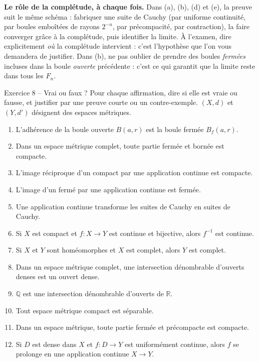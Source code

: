 \documentclass[11pt,a4paper]{article}
\newcommand{\R}{\mathbb{R}}
\newcommand{\Q}{\mathbb{Q}}
\newcommand{\Bf}{B_f}
\theoremstyle{definition}
\begin{document}
\begin{methode}
\textbf{Le rôle de la complétude, à chaque fois.} Dans (a), (b), (d) et (e), la preuve suit le même schéma : fabriquer une suite de Cauchy (par uniforme continuité, par boules emboîtées de rayons $2^{-n}$, par précompacité, par contraction), la faire converger grâce à la complétude, puis identifier la limite. À l'examen, dire explicitement \emph{où} la complétude intervient : c'est l'hypothèse que l'on vous demandera de justifier. Dans (b), ne pas oublier de prendre des boules \emph{fermées} incluses dans la boule \emph{ouverte} précédente : c'est ce qui garantit que la limite reste dans tous les $F_n$.
\end{methode}

\begin{exo}{Exercice 8 -- Vrai ou faux ?}
Pour chaque affirmation, dire si elle est vraie ou fausse, et justifier par une preuve courte ou un contre-exemple. $(X,d)$ et $(Y,d')$ désignent des espaces métriques.
\begin{enumerate}[label=\arabic*.]
  \item L'adhérence de la boule ouverte $B(a,r)$ est la boule fermée $\Bf(a,r)$.
  \item Dans un espace métrique complet, toute partie fermée et bornée est compacte.
  \item L'image réciproque d'un compact par une application continue est compacte.
  \item L'image d'un fermé par une application continue est fermée.
  \item Une application continue transforme les suites de Cauchy en suites de Cauchy.
  \item Si $X$ est compact et $f:X\to Y$ est continue et bijective, alors $f^{-1}$ est continue.
  \item Si $X$ et $Y$ sont homéomorphes et $X$ est complet, alors $Y$ est complet.
  \item Dans un espace métrique complet, une intersection dénombrable d'ouverts denses est un ouvert dense.
  \item $\Q$ est une intersection dénombrable d'ouverts de $\R$.
  \item Tout espace métrique compact est séparable.
  \item Dans un espace métrique, toute partie fermée et précompacte est compacte.
  \item Si $D$ est dense dans $X$ et $f:D\to Y$ est uniformément continue, alors $f$ se prolonge en une application continue $X\to Y$.
\end{enumerate}
\end{exo}
\end{document}
